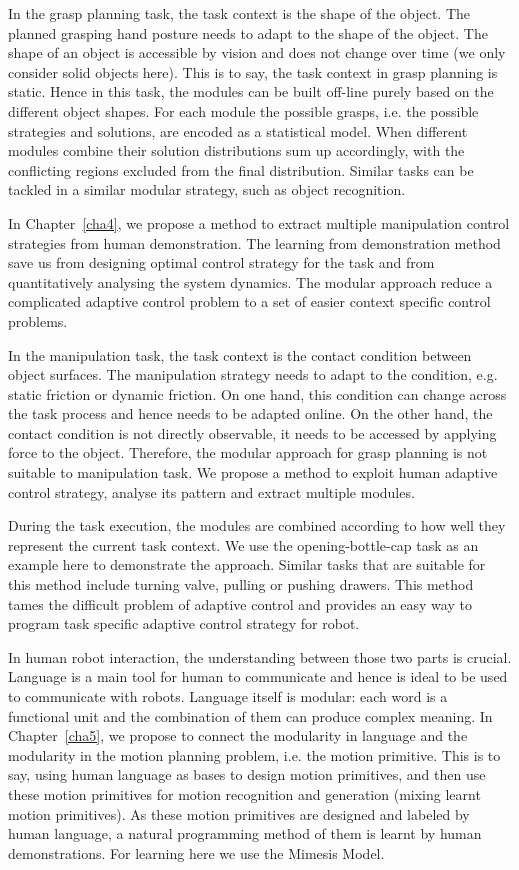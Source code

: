 In the grasp planning task, the task context is the shape of the object. The planned grasping hand posture needs to adapt to the shape of the object. The shape of an object is accessible by vision and does not change over time (we only consider solid objects here). This is to say, the task context in grasp planning is static. Hence in this task, the modules can be built off-line purely based on the different object shapes. For each module the possible grasps, i.e. the possible strategies and solutions, are encoded as a statistical model.
When different modules combine their solution distributions sum up accordingly, with the conflicting regions excluded from the final distribution. Similar tasks can be tackled in a similar modular strategy, such as object recognition.

In Chapter~\ref{cha4}, we propose a method to extract multiple manipulation control strategies from human demonstration. The learning from demonstration method save us from designing optimal control strategy for the task and from quantitatively analysing the system dynamics. The modular approach reduce a complicated adaptive control problem to a set of easier context specific control problems.

In the manipulation task, the task context is the contact condition between object surfaces. The manipulation strategy needs to adapt to the condition, e.g. static friction or dynamic friction. On one hand, this condition can change across the task process and hence needs to be adapted online. On the other hand, the contact condition is not directly observable, it needs to be accessed by applying force to the object. Therefore, the modular approach for grasp planning is not suitable to manipulation task. We propose a method to exploit human adaptive control strategy, analyse its pattern and extract multiple modules.

During the task execution, the modules are combined according to how well they represent the current task context. We use the opening-bottle-cap task as an example here to demonstrate the approach. Similar tasks that are suitable for this method include turning valve, pulling or pushing drawers. This method tames the difficult problem of adaptive control and
provides an easy way to program task specific adaptive control strategy for robot. %

In human robot interaction, the understanding between those two parts is crucial. Language is a main tool for human to communicate and hence is ideal to be used to communicate with robots. Language itself is modular: each word is a functional unit and the combination of them can produce complex meaning. In Chapter~\ref{cha5}, we propose to connect the modularity in language and the modularity in the motion planning problem, i.e. the motion primitive. This is to say, using human language as bases to design motion primitives, and then use these motion primitives for motion recognition and generation (mixing learnt motion primitives). As these motion primitives are designed and labeled by human language, a natural programming method of them is learnt by human demonstrations. For learning here we use the Mimesis Model.

